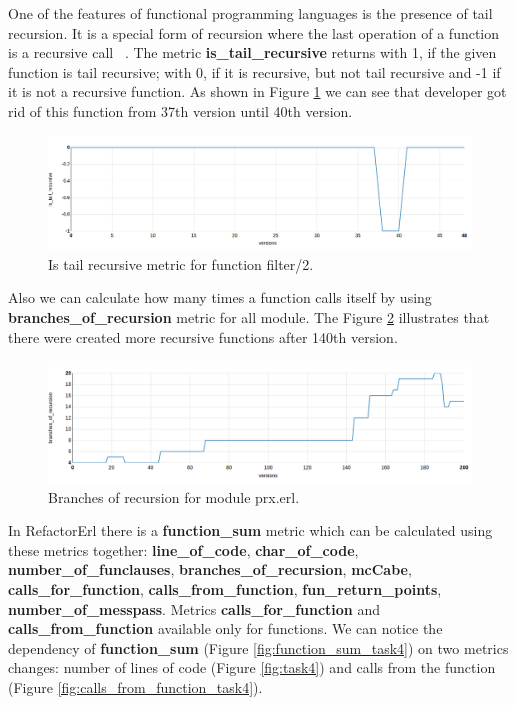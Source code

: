 One of the features of functional programming languages is the presence of tail recursion. It is a special form of recursion where the last operation of a function is a recursive call ~\cite{tail}.
The metric \textbf{is\_tail\_recursive} returns with 1, if the given function is tail recursive; with 0, if it is recursive, but not tail recursive and -1 if it is not a recursive function. As shown in Figure \ref{fig:tail1} we can see that developer got rid of this function from 37th version until 40th version.

\begin{figure}[ht]
	\centering
	\includegraphics[width=\textwidth]{figures/filter2.png}
	\caption{Is tail recursive metric for function filter/2.}
	\label{fig:tail1}
\end{figure}

Also we can calculate how many times a function calls itself by using \textbf{branches\_of\_recursion} metric for all module. The Figure \ref{fig:br} illustrates that there were created more recursive functions after 140th version.

\begin{figure}[ht]
	\centering
	\includegraphics[width=\textwidth]{figures/br.png}
	\caption{Branches of recursion for module prx.erl.} 
	\label{fig:br}
\end{figure}

In RefactorErl there is a \textbf{function\_sum} metric which can be calculated using these metrics together: \textbf{line\_of\_code}, \textbf{char\_of\_code}, \textbf{number\_of\_funclauses}, \textbf{branches\_of\_recursion},
\textbf{mcCabe}, \textbf{calls\_for\_function}, \textbf{calls\_from\_function}, \textbf{fun\_return\_points}, \textbf{number\_of\_messpass}. Metrics \textbf{calls\_for\_function} and \textbf{calls\_from\_function} available only for functions. We can notice the dependency of \textbf{function\_sum} (Figure \ref{fig:function_sum_task4}) on two metrics changes: number of lines of code (Figure \ref{fig:task4}) and calls from the function (Figure \ref{fig:calls_from_function_task4}).

